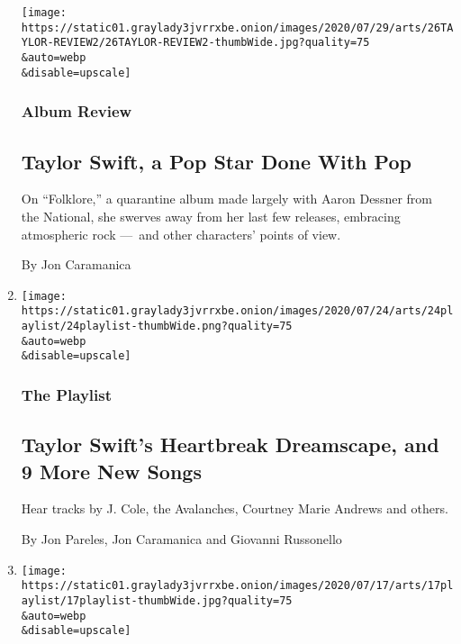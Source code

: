\begin{enumerate}
  \texttt{[image: https://static01.graylady3jvrrxbe.onion/images/2020/07/29/arts/26TAYLOR-REVIEW2/26TAYLOR-REVIEW2-thumbWide.jpg?quality=75\\\&auto=webp\\\&disable=upscale]}

  \hypertarget{album-review}{%
  \subsubsection{Album Review}\label{album-review}}

  \hypertarget{taylor-swift-a-pop-star-done-with-pop}{%
  \subsection{Taylor Swift, a Pop Star Done With
  Pop}\label{taylor-swift-a-pop-star-done-with-pop}}

  On ``Folklore,'' a quarantine album made largely with Aaron Dessner
  from the National, she swerves away from her last few releases,
  embracing atmospheric rock ---~and other characters' points of view.

  By Jon Caramanica
\item
  \href{/2020/07/24/arts/music/playlist-taylor-swift-j-cole-drake.html}{}

  \texttt{[image: https://static01.graylady3jvrrxbe.onion/images/2020/07/24/arts/24playlist/24playlist-thumbWide.png?quality=75\\\&auto=webp\\\&disable=upscale]}

  \hypertarget{the-playlist-1}{%
  \subsubsection{The Playlist}\label{the-playlist-1}}

  \hypertarget{taylor-swifts-heartbreak-dreamscape-and-9-more-new-songs}{%
  \subsection{Taylor Swift's Heartbreak Dreamscape, and 9 More New
  Songs}\label{taylor-swifts-heartbreak-dreamscape-and-9-more-new-songs}}

  Hear tracks by J. Cole, the Avalanches, Courtney Marie Andrews and
  others.

  By Jon Pareles, Jon Caramanica and Giovanni Russonello
\item
  \href{/2020/07/17/arts/music/playlist-drake-dj-khaled-mariah-carey.html}{}

  \texttt{[image: https://static01.graylady3jvrrxbe.onion/images/2020/07/17/arts/17playlist/17playlist-thumbWide.jpg?quality=75\\\&auto=webp\\\&disable=upscale]}


\end{enumerate}

